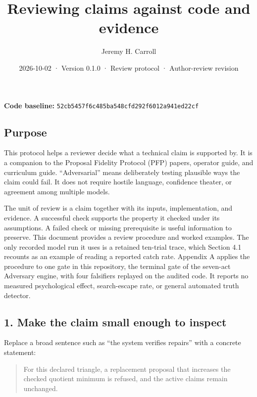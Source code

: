 \documentclass[
  11pt,
]{article}
\title{Reviewing claims against code and evidence}
\author{Jeremy H. Carroll}
\date{2026-10-02 · Version 0.1.0 · Review protocol · Author-review
revision}
\begin{document}
\makeatletter
\begin{center}
{\LARGE \@title\par}
\vspace{0.8em}
{\normalsize \@author\par}
\vspace{0.5em}
{\small \@date\par}
\end{center}
\makeatother

\textbf{Code baseline:}
\nolinkurl{52cb5457f6c485ba548cfd292f6012a941ed22cf}

\subsection{Purpose}\label{purpose}

This protocol helps a reviewer decide what a technical claim is
supported by. It is a companion to the Proposal Fidelity Protocol (PFP)
papers, operator guide, and curriculum guide. ``Adversarial'' means
deliberately testing plausible ways the claim could fail. It does not
require hostile language, confidence theater, or agreement among
multiple models.

The unit of review is a claim together with its inputs, implementation,
and evidence. A successful check supports the property it checked under
its assumptions. A failed check or missing prerequisite is useful
information to preserve. This document provides a review procedure and
worked examples. The only recorded model run it uses is a retained
ten-trial trace, which Section 4.1 recounts as an example of reading a
reported catch rate. Appendix A applies the procedure to one gate in
this repository, the terminal gate of the seven-act Adversary engine, with
four falsifiers replayed on the audited code. It reports no measured
psychological effect, search-escape rate, or general automated truth
detector.

\subsection{1. Make the claim small enough to
inspect}\label{make-the-claim-small-enough-to-inspect}

Replace a broad sentence such as ``the system verifies repairs'' with a
concrete statement:

\begin{quote}
For this declared triangle, a replacement proposal that increases the
checked quotient minimum is refused, and the active claims remain
unchanged.
\end{quote}
\end{document}

